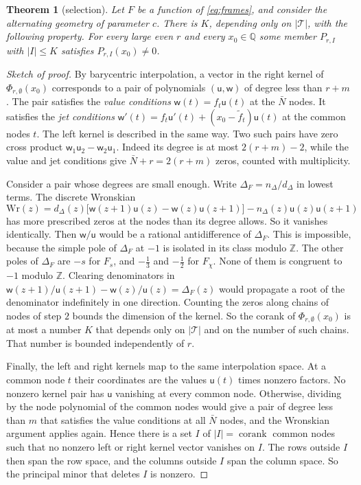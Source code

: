 \documentclass[11pt]{amsart}
\newtheorem{theorem}{Theorem}[section]
\theoremstyle{definition}
\theoremstyle{remark}
\numberwithin{equation}{section}
\newcommand{\Z}{\mathbb Z}
\newcommand{\Q}{\mathbb Q}
\newcommand{\corank}{\operatorname{corank}}
\begin{document}
\begin{theorem}[selection]\label{thm:selection}
Let $F$ be a function of \eqref{eq:frames}, and consider the alternating geometry of parameter $c$. There is $K$, depending
only on $|\mathcal T|$, with the following property. For every large even $r$ and
every $x_0\in\Q$ some member $P_{r,I}$ with $|I|\le K$ satisfies $P_{r,I}(x_0)\ne0$.
\end{theorem}

\begin{proof}[Sketch of proof]
By barycentric interpolation, a vector in the right kernel of $\Phi_{r,\emptyset}(x_0)$ corresponds to a
pair of polynomials $(\mathsf u,\mathsf w)$ of degree less than $r+m$. The pair satisfies the \emph{value conditions}
$\mathsf w(t)=f_t\mathsf u(t)$ at the $\bar N$ nodes. It satisfies the \emph{jet conditions}
$\mathsf w'(t)=f_t\mathsf u'(t)+(x_0-\tilde f_t)\mathsf u(t)$ at the common nodes $t$. The left kernel is described
in the same way. Two such pairs have zero cross product $\mathsf w_1\mathsf u_2-\mathsf w_2\mathsf u_1$. Indeed its
degree is at most $2(r+m)-2$, while the value and jet conditions give $\bar N+r=2(r+m)$ zeros, counted with multiplicity.

Consider a pair whose degrees are small enough. Write $\Delta_F=n_\Delta/d_\Delta$ in lowest terms. The discrete
Wronskian
\[
 \mathrm{Wr}(z)=d_\Delta(z)\bigl[\mathsf w(z+1)\mathsf u(z)-\mathsf w(z)\mathsf u(z+1)\bigr]
 -n_\Delta(z)\mathsf u(z)\mathsf u(z+1)
\]
has more prescribed zeros at the nodes than its degree allows. So it vanishes identically. Then
$\mathsf w/\mathsf u$ would be a rational antidifference of $\Delta_F$. This is impossible, because the simple pole of
$\Delta_F$ at $-1$ is isolated in its class modulo $\Z$. The other poles of $\Delta_F$ are $-s$ for $F_s$, and $-\frac13$
and $-\frac12$ for $F_\chi$. None of them is congruent to $-1$ modulo $\Z$. Clearing denominators in
$\mathsf w(z+1)/\mathsf u(z+1)-\mathsf w(z)/\mathsf u(z)=\Delta_F(z)$ would propagate a root of the denominator
indefinitely in one direction. Counting the zeros along chains of nodes of step $2$ bounds the dimension of the kernel.
So the corank of $\Phi_{r,\emptyset}(x_0)$ is at most a number $K$ that depends only on $|\mathcal T|$ and on the number
of such chains. That number is bounded independently of $r$.

Finally, the left and right kernels map to the same interpolation space. At a common node $t$ their coordinates are the
values $\mathsf u(t)$ times nonzero factors. No nonzero kernel pair has $\mathsf u$ vanishing at every common node.
Otherwise, dividing by the node polynomial of the common nodes would give a pair of degree less than $m$ that satisfies
the value conditions at all $\bar N$ nodes, and the Wronskian argument applies again. Hence there is a set $I$ of
$|I|=\corank$ common nodes such that no nonzero left or right kernel vector vanishes on $I$. The rows outside $I$ then
span the row space, and the columns outside $I$ span the column space. So the principal minor that deletes $I$ is
nonzero.
\end{proof}
\end{document}
